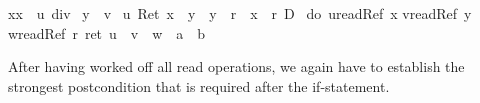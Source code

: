 \begin{isabellebody}
\begin{isamarkuptxt}
\begin{isabelle}
x{\isasymleftarrow}x\ {\isacharcolon}{\isacharequal}\ u\ div\ {}{\isacharsemicolon}\isanewline
{}y\ {\isacharcolon}{\isacharequal}\ v\ {\isacharasterisk}\isanewline
{}u{\isachardot}\ Ret\ {\isacharparenleft}x\ {\isasymnoteq}\ y\ {\isasymand}\ y\ {\isasymnoteq}\ r\ {\isasymand}\ x\ {\isasymnoteq}\ r{\isacharparenright}\ {\isasymand}\isactrlsub D\isanewline
{}\ {\isacharparenleft}do\ {\isacharbraceleft}u{\isasymleftarrow}readRef\ x{\isacharsemicolon}\isanewline
{}v{\isasymleftarrow}readRef\ y{\isacharsemicolon}\isanewline
{}w{\isasymleftarrow}readRef\ r{\isacharsemicolon}\ ret\ {\isacharparenleft}u\ {\isacharasterisk}\ v\ {\isacharplus}\ w\ {\isacharequal}\ a\ {\isacharasterisk}\ b{\isacharparenright}{\isacharbraceright}{\isacharparenright}{\isacharparenright}%
\end{isabelle}%
\end{isamarkuptxt}%
\isamarkuptrue%
\isamarkupfalse%
\isamarkupfalse%
\isamarkupfalse%
\isamarkupfalse%
\isamarkupfalse%
\isamarkupfalse%
\isamarkupfalse%
\isamarkupfalse%
\isamarkupfalse%
\isamarkupfalse%
\isamarkupfalse%
\isamarkupfalse%
\isamarkupfalse%
\isamarkupfalse%
\isamarkupfalse%
\isamarkupfalse%
\isamarkupfalse%
\isamarkupfalse%
\isamarkupfalse%
\isamarkupfalse%
\isamarkupfalse%
\isamarkupfalse%
\isamarkupfalse%
\isamarkupfalse%
\isamarkupfalse%
\isamarkupfalse%
\isamarkupfalse%
\isamarkupfalse%
\isamarkupfalse%
\isamarkupfalse%
\isamarkupfalse%
\isamarkupfalse%
\isamarkupfalse%
\isamarkupfalse%
\isamarkupfalse%
\isamarkupfalse%
\isamarkupfalse%
\isamarkupfalse%
\isamarkupfalse%
\isamarkupfalse%
\isamarkupfalse%
%
\begin{isamarkuptxt}%
After having worked off all read operations, we again have to establish the strongest
      postcondition that is required after the if-statement.


\end{isamarkuptxt}
\end{isabellebody}
